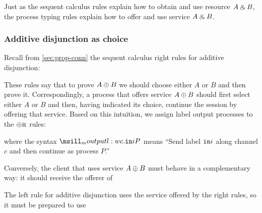 Just as the sequent calculus rules explain how to obtain and use resource $A \mathbin{\binampersand} B$, the process typing rules explain how to offer and use service $A \mathbin{\binampersand} B$.



\subsubsection{Additive disjunction as choice}\label{sec:addit-disj-as-choice}

Recall from \cref{sec:prop-conn} the sequent calculus right rules for additive disjunction:
These rules say that to prove $A \oplus B$ we should choose either $A$ or $B$ and then prove it.
Correspondingly, a process that offers service $A \oplus B$ should first select either $A$ or $B$ and then, having indicated its choice, continue the session by offering that service.
Based on this intuition, we assign label output processes to the $\rlab{{\llor}}$ rules:
where the syntax $\moutputl{c.\inj{i}; P}$ means \enquote{Send label $\mathtt{in}i$ along channel $c$ and then continue as process $P$.}

Conversely, the client that uses service $A \oplus B$ must behave in a complementary way:
it should receive the offerer of 

The left rule for additive disjunction uses the service offered by the right rules, so it must be prepared to use 

